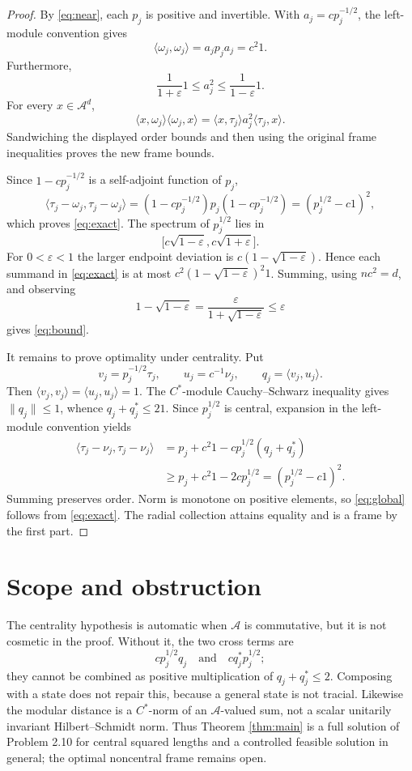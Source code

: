 \documentclass[11pt]{article}
\newcommand{\A}{\mathcal A}
\begin{document}
\begin{proof}
By \eqref{eq:near}, each $p_j$ is positive and invertible.  With
$a_j=cp_j^{-1/2}$, the left-module convention gives
\[
 \langle\omega_j,\omega_j\rangle
 =a_jp_ja_j=c^2 1.
\]
Furthermore,
\[
 \frac1{1+\varepsilon}1\le a_j^2
 \le\frac1{1-\varepsilon}1.
\]
For every $x\in\A^d$,
\[
 \langle x,\omega_j\rangle\langle\omega_j,x\rangle
 =\langle x,\tau_j\rangle a_j^2\langle\tau_j,x\rangle.
\]
Sandwiching the displayed order bounds and then using the original frame
inequalities proves the new frame bounds.

Since $1-cp_j^{-1/2}$ is a self-adjoint function of $p_j$,
\[
 \langle\tau_j-\omega_j,\tau_j-\omega_j\rangle
 =(1-cp_j^{-1/2})p_j(1-cp_j^{-1/2})
 =(p_j^{1/2}-c1)^2,
\]
which proves \eqref{eq:exact}.  The spectrum of $p_j^{1/2}$ lies in
\[
 \bigl[c\sqrt{1-\varepsilon},c\sqrt{1+\varepsilon}\bigr].
\]
For $0<\varepsilon<1$ the larger endpoint deviation is
$c(1-\sqrt{1-\varepsilon})$.  Hence each summand in \eqref{eq:exact} is at
most $c^2(1-\sqrt{1-\varepsilon})^2 1$.  Summing, using $nc^2=d$, and
observing
\[
 1-\sqrt{1-\varepsilon}
 =\frac{\varepsilon}{1+\sqrt{1-\varepsilon}}\le\varepsilon
\]
gives \eqref{eq:bound}.

It remains to prove optimality under centrality.  Put
\[
 v_j=p_j^{-1/2}\tau_j,\qquad u_j=c^{-1}\nu_j,
 \qquad q_j=\langle v_j,u_j\rangle.
\]
Then $\langle v_j,v_j\rangle=\langle u_j,u_j\rangle=1$.  The
$C^*$-module Cauchy--Schwarz inequality gives $\|q_j\|\le1$, whence
$q_j+q_j^*\le2 1$.  Since $p_j^{1/2}$ is central, expansion in the
left-module convention yields
\begin{align*}
 \langle\tau_j-\nu_j,\tau_j-\nu_j\rangle
 &=p_j+c^2 1-cp_j^{1/2}(q_j+q_j^*)\\
 &\ge p_j+c^2 1-2cp_j^{1/2}
  =(p_j^{1/2}-c1)^2.
\end{align*}
Summing preserves order.  Norm is monotone on positive elements, so
\eqref{eq:global} follows from \eqref{eq:exact}.  The radial collection
attains equality and is a frame by the first part.
\end{proof}

\section*{Scope and obstruction}

The centrality hypothesis is automatic when $\A$ is commutative, but it is
not cosmetic in the proof.  Without it, the two cross terms are
\[
 cp_j^{1/2}q_j\quad\text{and}\quad cq_j^*p_j^{1/2};
\]
they cannot be combined as positive multiplication of $q_j+q_j^*\le2$.
Composing with a state does not repair this, because a general state is not
tracial.  Likewise the modular distance is a $C^*$-norm of an
$\A$-valued sum, not a scalar unitarily invariant Hilbert--Schmidt norm.
Thus Theorem \ref{thm:main} is a full solution of Problem 2.10 for central
squared lengths and a controlled feasible solution in general; the optimal
noncentral frame remains open.
\end{document}
